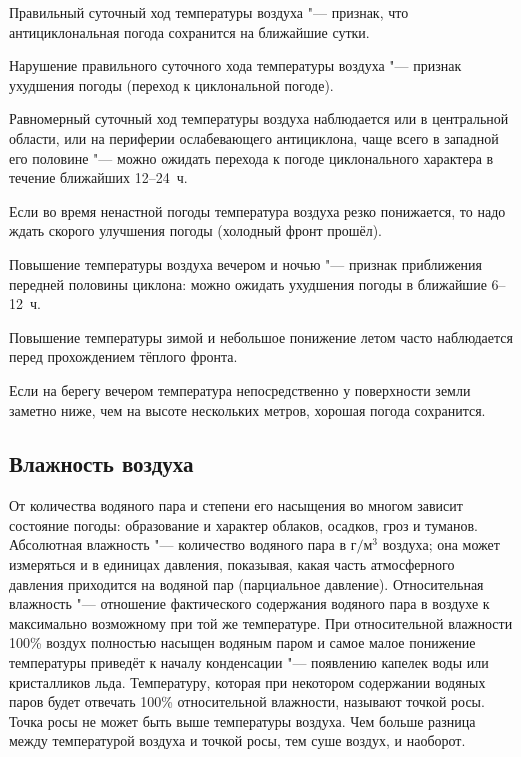  Правильный суточный ход температуры воздуха "--- признак, что
антициклональная погода сохранится на ближайшие сутки.

 Нарушение правильного суточного хода температуры воздуха "---
признак ухудшения погоды (переход к циклональной погоде).

 Равномерный суточный ход температуры воздуха наблюдается или в
центральной области, или на периферии ослабевающего антициклона, чаще
всего в западной его половине "--- можно ожидать перехода к погоде
циклонального характера в течение ближайших 12--24~ч.

 Если во время ненастной погоды температура воздуха резко
понижается, то надо ждать скорого улучшения погоды (холодный фронт
прошёл).

 Повышение температуры воздуха вечером и ночью "--- признак
приближения передней половины циклона: можно ожидать ухудшения погоды
в ближайшие 6--12~ч.

 Повышение температуры зимой и небольшое понижение летом часто
наблюдается перед прохождением тёплого фронта.

 Если на берегу вечером температура непосредственно у
поверхности земли заметно ниже, чем на высоте нескольких метров,
хорошая погода сохранится.

\subsection{Влажность воздуха}

От количества водяного пара и степени его насыщения во многом зависит
состояние погоды: образование и характер облаков, осадков, гроз и
туманов. Абсолютная влажность "--- количество водяного пара в г$/$м$^3$
воздуха; она может измеряться и в единицах давления, показывая, какая
часть атмосферного давления приходится на водяной пар (парциальное
давление). Относительная влажность "--- отношение фактического содержания
водяного пара в воздухе к максимально возможному при той же
температуре. При относительной влажности 100\% воздух полностью
насыщен водяным паром и самое малое понижение температуры приведёт к
началу конденсации "--- появлению капелек воды или кристалликов
льда. Температуру, которая при некотором содержании водяных паров
будет отвечать 100\% относительной влажности, называют точкой
росы. Точка росы не может быть выше температуры воздуха. Чем больше
разница между температурой воздуха и точкой росы, тем суше воздух, и
наоборот.

